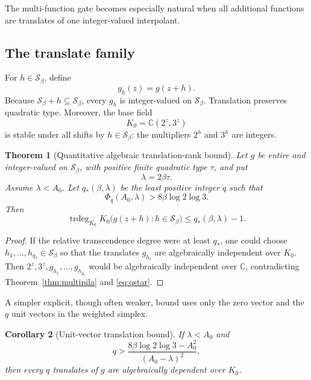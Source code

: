 \documentclass[11pt,oneside]{article}
\newtheorem{theorem}{Theorem}[section]
\newtheorem{corollary}[theorem]{Corollary}
\theoremstyle{definition}
\theoremstyle{remark}
\newcommand{\C}{\mathbb C}
\newcommand{\Sbeta}{\mathcal S_\beta}
\newcommand{\trdeg}{\operatorname{trdeg}}
\begin{document}
The multi-function gate becomes especially natural when all additional functions are
translates of one integer-valued interpolant.

\subsection{The translate family}

For $h\in\Sbeta$, define
\[
 g_h(z)=g(z+h).
\]
Because $\Sbeta+h\subseteq\Sbeta$, every $g_h$ is integer-valued on $\Sbeta$.  Translation
preserves quadratic type.  Moreover, the base field
\begin{equation}
 K_0=\C(2^z,3^z)
 \label{eq:K0}
\end{equation}
is stable under all shifts by $h\in\Sbeta$: the multipliers $2^h$ and $3^h$ are integers.

\begin{theorem}[Quantitative algebraic translation-rank bound]
\label{thm:translationrank}
Let $g$ be entire and integer-valued on $\Sbeta$, with positive finite quadratic type $\tau$, and
put
\[
 \lambda=2\beta\tau.
\]
Assume $\lambda<A_0$.  Let $q_*(\beta,\lambda)$ be the least positive integer $q$ such that
\begin{equation}
 \Phi_q(A_0,\lambda)>8\beta\log2\log3.
 \label{eq:qstar}
\end{equation}
Then
\begin{equation}
 \trdeg_{K_0}
 K_0\bigl(g(z+h):h\in\Sbeta\bigr)
 \le q_*(\beta,\lambda)-1.
 \label{eq:trdegbound}
\end{equation}
\end{theorem}

\begin{proof}
If the relative transcendence degree were at least $q_*$, one could choose
$h_1,\dots,h_{q_*}\in\Sbeta$ so that the translates $g_{h_i}$ are algebraically
independent over $K_0$.  Then $2^z,3^z,g_{h_1},\dots,g_{h_{q_*}}$ would be algebraically
independent over $\C$, contradicting Theorem~\ref{thm:multipila} and
\eqref{eq:qstar}.
\end{proof}

A simpler explicit, though often weaker, bound uses only the zero vector and the $q$ unit
vectors in the weighted simplex.

\begin{corollary}[Unit-vector translation bound]
\label{cor:unittranslation}
If $\lambda<A_0$ and
\begin{equation}
 q>
 \frac{8\beta\log2\log3-A_0^2}{(A_0-\lambda)^2},
 \label{eq:unitq}
\end{equation}
then every $q$ translates of $g$ are algebraically dependent over $K_0$.
\end{corollary}
\end{document}
